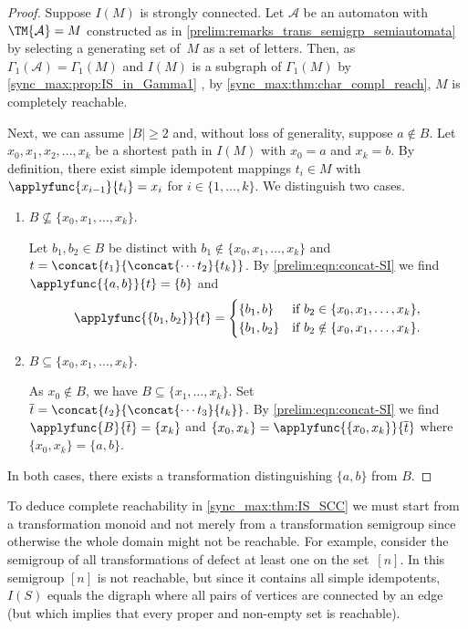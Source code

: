 \begin{proof}
    Suppose $I(M)$ is strongly connected.
	Let $\mathcal A$ be an automaton with $\TM{\mathcal A} = M$
	constructed as in \cref{prelim:remarks_trans_semigrp_semiautomata}
	by selecting a generating set of~$M$ as a set of letters.
	Then, as $\Gamma_1(\mathcal A) = \Gamma_1(M)$ and $I(M)$ is a subgraph of $\Gamma_1(M)$ by \cref{sync_max:prop:IS_in_Gamma1} , 
	by \cref{sync_max:thm:char_compl_reach}, $M$ is completely reachable.
		
    Next, we can assume $|B| \ge 2$
    and, without loss of generality, suppose $a \notin B$.
	Let $x_0, x_1, x_2, \ldots, x_k$ be a shortest path in $I(M)$
	with $x_0 = a$ and $x_k = b$.
	By definition, there exist simple idempotent mappings $t_i \in M$
	with $\applyfunc{x_{i-1}}{t_i} = x_i$ for $i \in \{1,\ldots,k\}$.
	We distinguish two cases.
	
	\begin{enumerate}
	\item $B \not\subseteq \{x_0, x_1, \ldots, x_k\}$.
		
		Let $b_1, b_2 \in B$ be distinct with $b_1 \notin \{x_0, x_1, \ldots, x_k\}$
		and $t = \concat{t_1}{\concat{\cdots t_2}{t_k}}$.
		By \cref{prelim:eqn:concat-SI}
		we find $\applyfunc{\{a,b\}}{t} = \{b\}$
		and \[
		\applyfunc{\{b_1, b_2\}}{t} = \begin{cases}
			\{b_1, b\}   & \mbox{if } b_2 \in    \{x_0,x_1, \ldots, x_k\}, \\
			\{b_1, b_2\} & \mbox{if } b_2 \notin \{x_0,x_1, \ldots, x_k\}.
		\end{cases}
	    \]
		
	\item $B \subseteq \{x_0, x_1, \ldots, x_k\}$. 
		
		As $x_0 \notin B$,
		we have $B \subseteq \{x_1, \ldots, x_k\}$.
		Set $\overline t = \concat{t_2}{\concat{\cdots t_{3}}{t_k}}$.
		By \cref{prelim:eqn:concat-SI} we find
		$\applyfunc{B}{\overline t} = \{x_k\}$
		and $\{x_0, x_k\}  = \applyfunc{\{x_0, x_k\}}{\overline t}$ where $\{x_0, x_k\} = \{a,b\}$.
	\end{enumerate}
    In both cases, there exists a transformation distinguishing $\{a,b\}$ from $B$.
\end{proof}

\begin{remark} 
	To deduce complete reachability in \cref{sync_max:thm:IS_SCC}
	we must start from a transformation monoid and not merely from a transformation semigroup
	since otherwise the whole domain might not be reachable.
	For example, consider the semigroup of all transformations of defect at least one on the set~$[n]$.
	In this semigroup $[n]$ is not reachable,
	but since it contains all simple idempotents, $I(S)$
	equals the digraph where all pairs of vertices are connected by an edge 
	(but which implies that every proper and non-empty set is reachable).
\end{remark}

